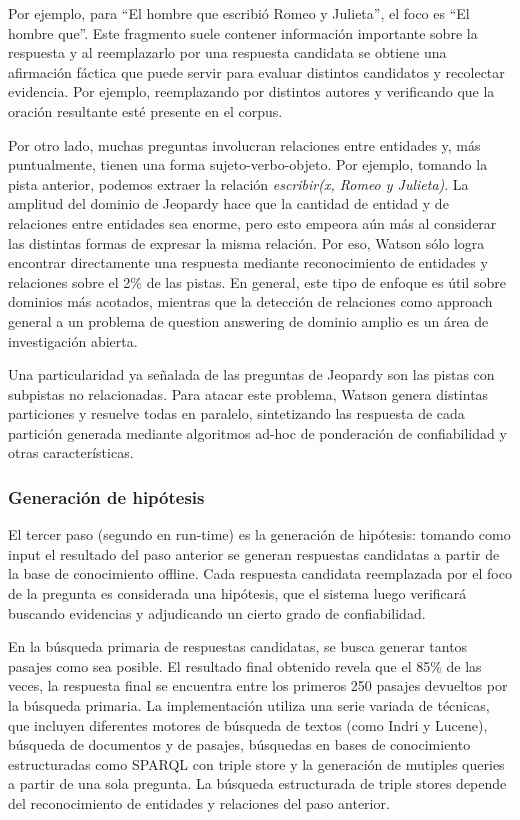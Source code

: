 Por ejemplo, para {\textquotedblleft}El hombre que escribió Romeo y
Julieta{\textquotedblright}, el foco es {\textquotedblleft}El hombre
que{\textquotedblright}. Este fragmento suele contener información
importante sobre la respuesta y al reemplazarlo por una respuesta
candidata se obtiene una afirmación fáctica que puede servir para
evaluar distintos candidatos y recolectar evidencia. Por ejemplo,
reemplazando por distintos autores y verificando que la oración
resultante esté presente en el corpus.

Por otro lado, muchas preguntas involucran relaciones entre entidades y,
más puntualmente, tienen una forma sujeto-verbo-objeto. Por ejemplo,
tomando la pista anterior, podemos extraer la relación
\textit{escribir(x, Romeo y Julieta)}. La amplitud del dominio de
Jeopardy hace que la cantidad de entidad y de relaciones entre
entidades sea enorme, pero esto empeora aún más al considerar las
distintas formas de expresar la misma relación. Por eso, Watson
sólo logra encontrar directamente una respuesta mediante
reconocimiento de entidades y relaciones sobre el 2\% de las pistas. En
general, este tipo de enfoque es útil sobre dominios más acotados,
mientras que la detección de relaciones como approach general a un
problema de question answering de dominio amplio es un área de
investigación abierta. 

Una particularidad ya señalada de las preguntas de Jeopardy son las
pistas con subpistas no relacionadas. Para atacar este problema, Watson
genera distintas particiones y resuelve todas en paralelo, sintetizando
las respuesta de cada partición generada mediante algoritmos ad-hoc
de ponderación de confiabilidad y otras características.

\subsubsection*{Generación de hipótesis}

El tercer paso (segundo en run-time) es la generación de hipótesis:
tomando como input el resultado del paso anterior se generan respuestas
candidatas a partir de la base de conocimiento offline. Cada respuesta
candidata reemplazada por el foco de la pregunta es considerada una
hipótesis, que el sistema luego verificará buscando evidencias y
adjudicando un cierto grado de confiabilidad.

En la búsqueda primaria de respuestas candidatas, se busca generar
tantos pasajes como sea posible. El resultado final obtenido revela que
el 85\% de las veces, la respuesta final se encuentra entre los
primeros 250 pasajes devueltos por la búsqueda primaria. La
implementación utiliza una serie variada de técnicas, que incluyen
diferentes motores de búsqueda de textos (como Indri y Lucene),
búsqueda de documentos y de pasajes, búsquedas en bases de
conocimiento estructuradas como SPARQL con triple store y la
generación de mutiples queries a partir de una sola pregunta. La
búsqueda estructurada de triple stores depende del reconocimiento de
entidades y relaciones del paso anterior.

